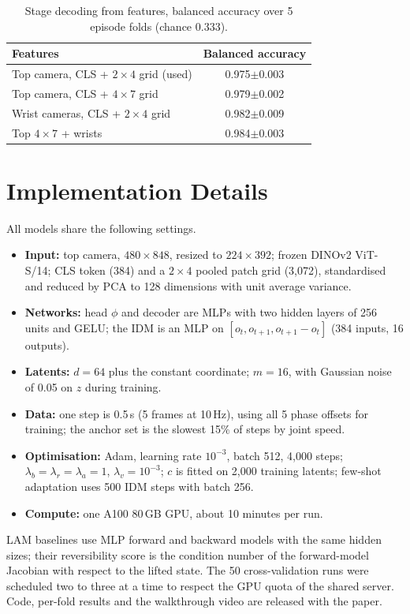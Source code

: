 \begin{table}
	\centering
	\caption{Stage decoding from features, balanced accuracy over 5 episode folds (chance 0.333).}
	\label{t:feat}
	\footnotesize
	\begin{tabular}{lc}
		\toprule
		Features & Balanced accuracy \\
		\midrule
		Top camera, CLS + $2\times4$ grid (used) & 0.975$\pm$0.003 \\
		Top camera, CLS + $4\times7$ grid & 0.979$\pm$0.002 \\
		Wrist cameras, CLS + $2\times4$ grid & 0.982$\pm$0.009 \\
		Top $4\times7$ + wrists & 0.984$\pm$0.003 \\
		\bottomrule
	\end{tabular}
\end{table}

\section{Implementation Details} \label{a:impl}

All models share the following settings.
\begin{itemize}
	\item \textbf{Input:} top camera, $480\times848$, resized to $224\times392$; frozen DINOv2 ViT-S/14; CLS token (384) and a $2\times4$ pooled patch grid (3,072), standardised and reduced by PCA to 128 dimensions with unit average variance.
	\item \textbf{Networks:} head $\phi$ and decoder are MLPs with two hidden layers of 256 units and GELU; the IDM is an MLP on $[o_t,o_{t+1},o_{t+1}-o_t]$ (384 inputs, 16 outputs).
	\item \textbf{Latents:} $d=64$ plus the constant coordinate; $m=16$, with Gaussian noise of 0.05 on $z$ during training.
	\item \textbf{Data:} one step is 0.5\,s (5 frames at 10\,Hz), using all 5 phase offsets for training; the anchor set is the slowest 15\% of steps by joint speed.
	\item \textbf{Optimisation:} Adam, learning rate $10^{-3}$, batch 512, 4,000 steps; $\lambda_b=\lambda_r=\lambda_a=1$, $\lambda_v=10^{-3}$; $c$ is fitted on 2,000 training latents; few-shot adaptation uses 500 IDM steps with batch 256.
	\item \textbf{Compute:} one A100 80\,GB GPU, about 10 minutes per run.
\end{itemize}
LAM baselines use MLP forward and backward models with the same hidden sizes; their reversibility score is the condition number of the forward-model Jacobian with respect to the lifted state.
The 50 cross-validation runs were scheduled two to three at a time to respect the GPU quota of the shared server.
Code, per-fold results and the walkthrough video are released with the paper.
